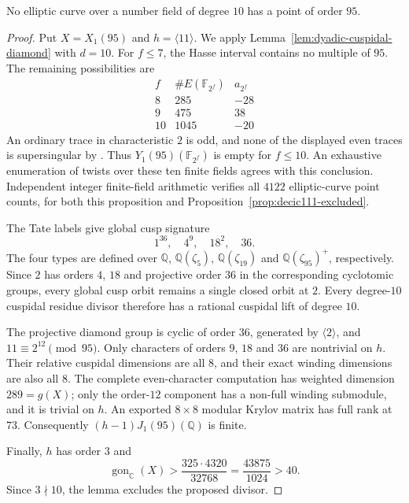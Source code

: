 \begin{proposition}\label{prop:decic95-excluded}
No elliptic curve over a number field of degree $10$ has a point
of order $95$.
\end{proposition}
\begin{proof}
Put $X=X_1(95)$ and $h=\langle11\rangle$.
We apply Lemma~\ref{lem:dyadic-cuspidal-diamond} with $d=10$.
For $f\leq7$, the Hasse interval contains no multiple of $95$.
The remaining possibilities are
\[
\begin{array}{c|c|c}
f&\#E(\mathbb F_{2^f})&a_{2^f}\\\hline
8&285&-28\\
9&475&38\\
10&1045&-20
\end{array}
\]
An ordinary trace in characteristic $2$ is odd, and none of the
displayed even traces is supersingular by
\cite[Theorem~4.1]{Waterhouse}.
Thus $Y_1(95)(\mathbb F_{2^f})$ is empty for $f\leq10$.
An exhaustive enumeration of twists over these ten finite fields
agrees with this conclusion. Independent integer finite-field
arithmetic verifies all $4122$ elliptic-curve point counts, for
both this proposition and Proposition~\ref{prop:decic111-excluded}.

The Tate labels give global cusp signature
\[
 1^{36},\quad4^9,\quad18^2,\quad36.
\]
The four types are defined over $\mathbb Q$,
$\mathbb Q(\zeta_5)$, $\mathbb Q(\zeta_{19})$ and
$\mathbb Q(\zeta_{95})^+$, respectively.
Since $2$ has orders $4$, $18$ and projective order $36$
in the corresponding cyclotomic groups, every global cusp orbit
remains a single closed orbit at $2$.
Every degree-$10$ cuspidal residue divisor therefore has a rational
cuspidal lift of degree $10$.

The projective diamond group is cyclic of order $36$, generated by
$\langle2\rangle$, and $11\equiv2^{12}\pmod{95}$.
Only characters of orders $9$, $18$ and $36$ are nontrivial on $h$.
Their relative cuspidal dimensions are all $8$, and their exact
winding dimensions are also all $8$.
The complete even-character computation has weighted dimension
$289=g(X)$; only the order-$12$ component has a non-full winding
submodule, and it is trivial on $h$.
An exported $8\times8$ modular Krylov matrix has full rank at $73$.
Consequently $(h-1)J_1(95)(\mathbb Q)$ is finite.

Finally, $h$ has order $3$ and
\[
 \operatorname{gon}_{\mathbb C}(X)>
 \frac{325\cdot4320}{32768}
 =\frac{43875}{1024}>40.
\]
Since $3\nmid10$, the lemma excludes the proposed divisor.
\end{proof}
